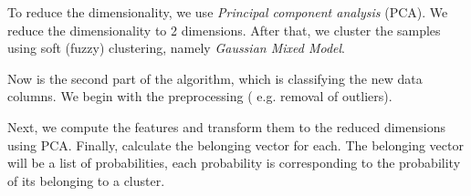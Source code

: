 \documentclass{article}
\newcommand{\comm}[2][inline]{\color{red} #2 \color{black}}
\begin{document}
To reduce the dimensionality, we use \textit{Principal component analysis} (PCA). We reduce the dimensionality to 2 dimensions. After that, we cluster the samples using soft (fuzzy) clustering, namely \textit{Gaussian Mixed Model}.

Now is the second part of the algorithm, which is classifying the new data columns. We begin with the preprocessing ( e.g. removal of outliers). 


 Next, we compute the features and transform them to the reduced dimensions using PCA. Finally, calculate the belonging vector for each. The belonging vector will be a list of probabilities, each probability is corresponding to the probability of its belonging to a cluster. 
 
 
  




\end{document}
